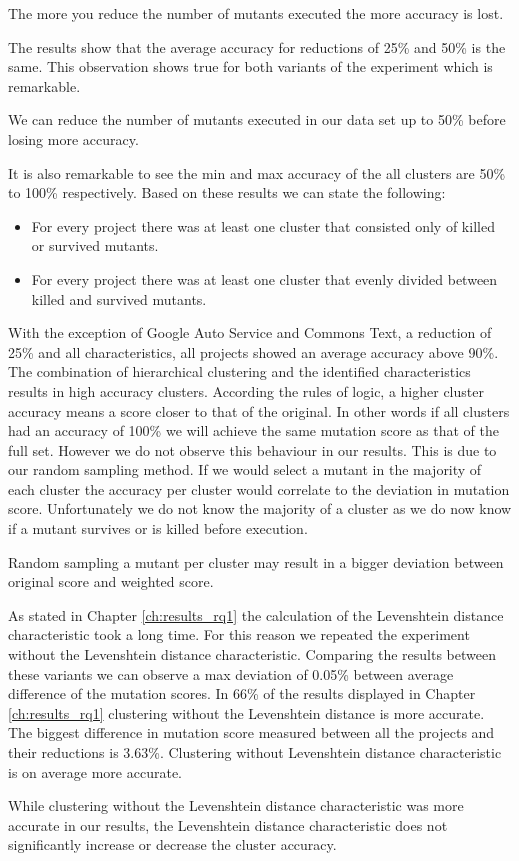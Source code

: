 \documentclass[../main]{subfiles}
\begin{document}
\begin{finding}
    The more you reduce the number of mutants executed the more accuracy is lost.
\end{finding}
The results show that the average accuracy for reductions of 25\% and 50\% is the same.
This observation shows true for both variants of the experiment which is remarkable.
\begin{finding}
    We can reduce the number of mutants executed in our data set up to 50\% before losing more accuracy.
\end{finding}
It is also remarkable to see the min and max accuracy of the all clusters are 50\% to 100\% respectively.
Based on these results we can state the following:
\begin{itemize}
    \item For every project there was at least one cluster that consisted only of killed or survived mutants.
    \item For every project there was at least one cluster that evenly divided between killed and survived mutants.
\end{itemize}
With the exception of Google Auto Service and Commons Text, a reduction of 25\% and all characteristics, all projects showed an average accuracy above 90\%.
The combination of hierarchical clustering and the identified characteristics results in high accuracy clusters.
\newline
According the rules of logic, a higher cluster accuracy means a score closer to that of the original.
In other words if all clusters had an accuracy of 100\% we will achieve the same mutation score as that of the full set.
However we do not observe this behaviour in our results.
This is due to our random sampling method.
If we would select a mutant in the majority of each cluster the accuracy per cluster would correlate to the deviation in mutation score.
Unfortunately we do not know the majority of a cluster as we do now know if a mutant survives or is killed before execution.
\begin{finding}
    Random sampling a mutant per cluster may result in a bigger deviation between original score and weighted score.
\end{finding}
As stated in Chapter \ref{ch:results_rq1} the calculation of the Levenshtein distance characteristic took a long time.
For this reason we repeated the experiment without the Levenshtein distance characteristic.
Comparing the results between these variants we can observe a max deviation of 0.05\% between average difference of the mutation scores.
In 66\% of the results displayed in Chapter \ref{ch:results_rq1} clustering without the Levenshtein distance is more accurate.
The biggest difference in mutation score measured between all the projects and their reductions is 3.63\%.
Clustering without Levenshtein distance characteristic is on average more accurate.
\begin{finding}
    While clustering without the Levenshtein distance characteristic was more accurate in our results, the Levenshtein distance characteristic does not significantly increase or decrease the cluster accuracy.
\end{finding}
\end{document}

